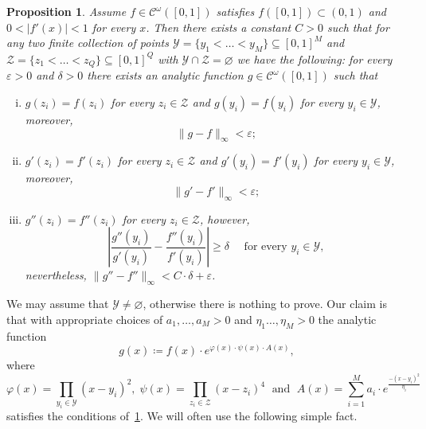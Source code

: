 \documentclass[12pt,]{article}
\newtheorem{proposition}[theorem]{Proposition}
\theoremstyle{definition}
\theoremstyle{remark}
\newcommand{\0}{\mathbf{0}}
\begin{document}
{\begin{proposition}\label{prop:AnalyticBumpFunc}
Assume $f\in \mathcal{C}^{\omega}([0,1])$ satisfies $f([0,1])\subset (0,1)$ and $0<|f'(x)|<1$ for every $x$. Then there exists a constant $C>0$ such that for any two finite collection of points $\mathcal{Y}=\{y_1<\ldots<y_M\}\subseteq[0,1]^M$ and $\mathcal{Z}=\{z_1<\ldots< z_Q\}\subseteq[0,1]^Q$ with $\mathcal{Y}\cap\mathcal{Z}=\varnothing$ we have the following: for every $\varepsilon>0$ and $\delta>0$ there exists an analytic function $g\in\mathcal{C}^{\omega}([0,1])$ such that
\begin{enumerate}[(i)]
\item $g(z_i)=f(z_i)$ for every $z_i\in\mathcal{Z}$ and $g(y_i)=f(y_i)$ for every $y_i\in\mathcal{Y}$, moreover,
\begin{equation*}
\|g-f\|_{\infty}<\varepsilon;
\end{equation*}
\item  $g'(z_i)=f'(z_i)$ for every $z_i\in\mathcal{Z}$ and $g'(y_i)=f'(y_i)$ for every $y_i\in\mathcal{Y}$, moreover,
\begin{equation*}
	\|g'-f'\|_{\infty}<\varepsilon;
\end{equation*}
\item $g''(z_i)=f''(z_i)$ for every $z_i\in\mathcal{Z}$, however,
\begin{equation*}
	\left| \frac{g''(y_i)}{g'(y_i)} - \frac{f''(y_i)}{f'(y_i)} \right|\geq \delta \quad\text{ for every } y_i\in\mathcal{Y},
\end{equation*}
nevertheless, $	\|g''-f''\|_{\infty}<C\cdot \delta +\varepsilon$.
\end{enumerate}
\end{proposition}

We may assume that $\mathcal{Y}\neq\varnothing$, otherwise there is nothing to prove. Our claim is that with appropriate choices of $a_1,\ldots,a_M>0$ and $\eta_1\ldots,\eta_M>0$ the analytic function
\begin{equation}\label{eq:BumpFunc}
g(x)\coloneqq f(x)\cdot e^{\varphi(x)\cdot \psi(x)\cdot A(x)},
\end{equation} 
where
\begin{equation*}
\varphi(x)=\prod_{y_i\in\mathcal{Y}} (x-y_i)^2,\; \psi(x) = \prod_{z_i\in\mathcal{Z}} (x-z_i)^4 \;\text{ and }\; A(x)= \sum_{i=1}^{M} a_i\cdot e^{\frac{-(x-y_i)^2}{\eta_i}}
\end{equation*}
satisfies the conditions of~\cref{prop:AnalyticBumpFunc}. We will often use the following simple fact.

}
\end{document}
